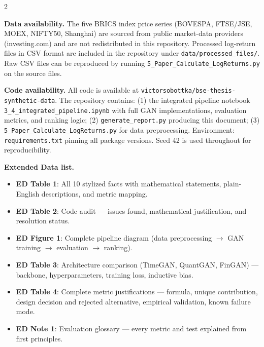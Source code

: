 \documentclass[10pt]{article}
\begin{document}
\begin{multicols}{2}
\small

\textbf{Data availability.}
The five BRICS index price series (BOVESPA, FTSE/JSE, MOEX, NIFTY50, Shanghai) are sourced from public market-data providers (investing.com) and are not redistributed in this repository. Processed log-return files in CSV format are included in the repository under \texttt{data/processed\_files/}. Raw CSV files can be reproduced by running \texttt{5\_Paper\_Calculate\_LogReturns.py} on the source files.

\textbf{Code availability.}
All code is available at \texttt{victorsobottka/bse-thesis-synthetic-data}. The repository contains: (1) the integrated pipeline notebook \texttt{3\_4\_integrated\_pipeline.ipynb} with full GAN implementations, evaluation metrics, and ranking logic; (2) \texttt{generate\_report.py} producing this document; (3) \texttt{5\_Paper\_Calculate\_LogReturns.py} for data preprocessing. Environment: \texttt{requirements.txt} pinning all package versions. Seed 42 is used throughout for reproducibility.

\columnbreak

\textbf{Extended Data list.}
\begin{itemize}[noitemsep,topsep=1pt]
  \item \textbf{ED Table 1}: All 10 stylized facts with mathematical statements, plain-English descriptions, and metric mapping.
  \item \textbf{ED Table 2}: Code audit --- issues found, mathematical justification, and resolution status.
  \item \textbf{ED Figure 1}: Complete pipeline diagram (data preprocessing $\to$ GAN training $\to$ evaluation $\to$ ranking).
  \item \textbf{ED Table 3}: Architecture comparison (TimeGAN, QuantGAN, FinGAN) --- backbone, hyperparameters, training loss, inductive bias.
  \item \textbf{ED Table 4}: Complete metric justifications --- formula, unique contribution, design decision and rejected alternative, empirical validation, known failure mode.
  \item \textbf{ED Note 1}: Evaluation glossary --- every metric and test explained from first principles.
\end{itemize}

\end{multicols}

\clearpage

\end{document}
